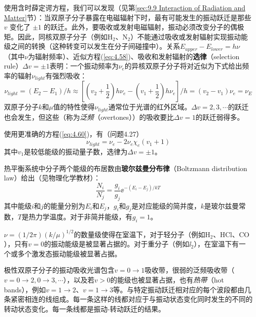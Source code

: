     使用含时薛定谔方程，我们可以发现（见第\ref{sec:9.9 Interaction of Radiation and Matter}节）：当双原子分子暴露在电磁辐射下时，最有可能发生的振动跃迁是那些 $v$ 变化了 $\pm 1$ 的跃迁。此外，要吸收或发射电磁辐射，振动必须改变分子的偶极矩。因此，同核双原子分子（例如$\mathrm{H}_2$、$\mathrm{N}_2$）不能通过吸收或发射辐射实现振动能级之间的转换（这种转变可以发生在分子间碰撞中）。关系$E_{upper}-E_{lower} = h\nu$（其中$\nu$为辐射频率）、近似方程(\ref{eq:4.58})、吸收和发射辐射的\textbf{选律}（selection rule）$\Delta v = \pm 1$表明：一个振动频率为$\nu_e$的异核双原子分子将对近似为下式给出频率的辐射$\nu_{light}$有强烈吸收：
    \begin{equation}
        \nu_{light} = \left(E_2-E_1\right)/h \approx \left[\left(v_2+\frac{1}{2}\right)h\nu_e-\left(v_1+\frac{1}{2}\right)h\nu_e\right]/h = \left(v_2-v_1\right)\nu_e = \nu_E
        \label{eq:4.61}
    \end{equation}
    双原子分子$k$和$\mu$值的特性使得$\nu_{light}$通常位于光谱的红外区域。$\Delta v = 2,3,\cdots$的跃迁也会发生，但这些（称为\textit{泛频}（overtones））的吸收要比$\Delta v = 1$的跃迁弱得多。

    使用更准确的方程(\ref{eq:4.60})，有（问题4.27）
    \begin{equation}
        \nu_{light} = \nu_e - 2\nu_e\chi_e\left(v_1+1\right)
        \label{eq:4.62}
    \end{equation}
    其中$v_1$是较低能级的振动量子数，选律为$\Delta v = \pm 1$。

    热平衡系统中分子两个能级的布居数由\textbf{玻尔兹曼分布律}（Boltzmann distribution law）给出（见物理化学教材）：
    \begin{equation}
        \boxed{
            \frac{N_i}{N_j} = \frac{g_i}{g_j} \ee ^{-(E_i-E_j)/kT}
        }
        \label{eq:4.63}
    \end{equation}
    其中能级$i$和$j$的能量分别为$E_i$和$E_j$，$g_i$和$g_j$是对应能级的简并度，$k$是玻尔兹曼常数，$T$是热力学温度。对于非简并能级，有$g_i=1$。

    $\nu = \left(1/2\pi\right)\left(k/\mu\right)^{1/2}$的数量级使得在室温下，对于轻分子（例如$\mathrm{H}_2$、$\mathrm{HCl}$、$\mathrm{CO}$），只有$v=0$的振动能级是被显著占据的。对于重分子（例如$\ii _2$），在室温下有一个或多个激发态振动能级被显著占据。

    极性双原子分子的振动吸收光谱包含$v= 0 \to 1$吸收带，很弱的泛频吸收带（$v = 0\to 2, 0 \to 3, \cdots$），以及若$v>0$的能级也被显著占据，也有\textit{热带}（hot bands），例如$v = 1 \to 2$、$v = 1 \to 3$等。与特定振动跃迁相对应的每个波段都由几条紧密相连的线组成。每一条这样的线都对应于与振动状态变化同时发生的不同的转动状态变化。每一条线都是振动-转动跃迁的结果。

